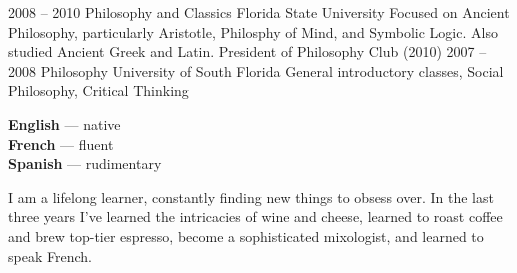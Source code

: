 \documentclass[9pt]{developercv} %
\begin{document}


\begin{entrylist}
    \entry
    {2008 -- 2010}
    {Philosophy and Classics}
    {Florida State University}
    {Focused on Ancient Philosophy, particularly Aristotle, Philosphy of
        Mind, and Symbolic Logic. Also studied Ancient Greek and Latin.
    President of Philosophy Club (2010)}
    \entry
    {2007 -- 2008}
    {Philosophy}
    {University of South Florida}
    {General introductory classes, Social Philosophy, Critical Thinking}
\end{entrylist}

%
\begin{minipage}[t]{0.3\textwidth}
    \vspace{-\baselineskip} %


    \textbf{English} --- native\\
    \textbf{French} --- fluent\\
    \textbf{Spanish} --- rudimentary

\end{minipage}
\hfill
\begin{minipage}[t]{0.7\textwidth}
    \vspace{-\baselineskip} %


    I am a lifelong learner, constantly finding new things to obsess over. In
    the last three years I've learned the intricacies of wine and cheese,
    learned to roast coffee and brew top-tier espresso, become a sophisticated
    mixologist, and learned to speak French.
\end{minipage}
%
%

\end{document}
